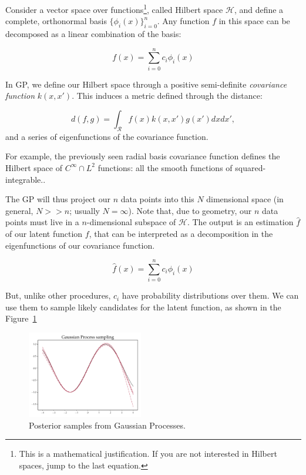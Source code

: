 Consider a vector space over functions\footnote{This is a mathematical justification. If you are not interested in Hilbert spaces, jump to the last equation.}, called Hilbert space $\mathscr{H}$, and define a complete, orthonormal basis $\{\phi_i(x)\}_{i=0}^{n}$.
Any function $f$ in this space can be decomposed as a linear combination of the basis:

 \[f(x) = \sum_{i=0}^{n} c_i \phi_i(x)\]
 
In GP, we define our Hilbert space through a positive semi-definite \emph{covariance function} $k(x, x')$.
This induces a metric defined through the distance:

	\[	d(f, g) =\int_{\mathcal{R}}  f(x) k(x, x') g(x') dx dx', \]
and a series of eigenfunctions of the covariance function.
	
For example, the previously seen radial basis covariance function defines the Hilbert space of $C^\infty \cap L^2$ functions: all the smooth functions of squared-integrable..
	
The GP will thus project our $n$ data points into this $N$ dimensional space (in general, $N >> n$; usually $N = \infty$). Note that, due to geometry, our $n$ data points must live in a $n$-dimensional subspace of $\mathscr{H}$.
The output is an estimation $\hat f$ of our latent function $f$, that can be interpreted as a decomposition in the eigenfunctions of our covariance function.
	
	\[\hat f(x) = \sum_{i=0}^{n} c_i \phi_i(x)\]
	
But, unlike other procedures, $c_i$ have probability distributions over them.
We can use them to sample likely candidates for the latent function, as shown in the Figure~\ref{fig:gp_sampling}
	
\begin{figure}[hbt]
\centering
	\includegraphics[width=0.45\textwidth]{machine_learning/figures/sin_samples}
	\caption{Posterior samples from Gaussian Processes.}\label{fig:gp_sampling}
\end{figure}

